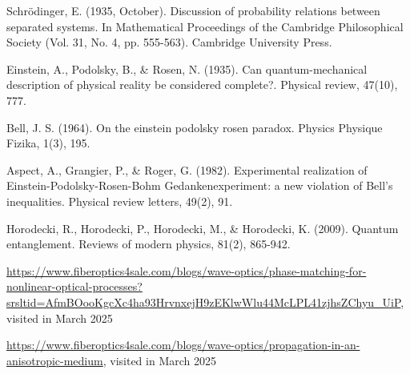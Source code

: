 \documentclass[a4paper, 12pt,oneside]{article}
\begin{document}
\begin{thebibliography}{99}

    Schrödinger, E. (1935, October). Discussion of probability relations between separated systems. In Mathematical Proceedings of the Cambridge Philosophical Society (Vol. 31, No. 4, pp. 555-563). Cambridge University Press.
    
    Einstein, A., Podolsky, B., \& Rosen, N. (1935). Can quantum-mechanical description of physical reality be considered complete?. Physical review, 47(10), 777.
    
    Bell, J. S. (1964). On the einstein podolsky rosen paradox. Physics Physique Fizika, 1(3), 195.

    Aspect, A., Grangier, P., \& Roger, G. (1982). Experimental realization of Einstein-Podolsky-Rosen-Bohm Gedankenexperiment: a new violation of Bell's inequalities. Physical review letters, 49(2), 91.

    Horodecki, R., Horodecki, P., Horodecki, M., \& Horodecki, K. (2009). Quantum entanglement. Reviews of modern physics, 81(2), 865-942.
    
    \url{https://www.fiberoptics4sale.com/blogs/wave-optics/phase-matching-for-nonlinear-optical-processes?srsltid=AfmBOooKgcXc4ha93HrvnxejH9zEKlwWlu44McLPL41zjhsZChyu_UiP}, visited in March 2025

    \url{https://www.fiberoptics4sale.com/blogs/wave-optics/propagation-in-an-anisotropic-medium}, visited in March 2025


    
\end{thebibliography}
\end{document}
